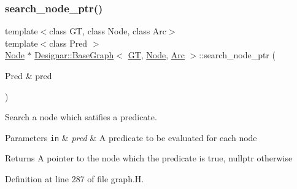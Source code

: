 \subsubsection{\texorpdfstring{search\+\_\+node\+\_\+ptr()}{search\_node\_ptr()}\hspace{0.1cm}{\footnotesize\ttfamily [1/2]}}
{\footnotesize\ttfamily template$<$class GT, class Node, class Arc$>$ \\
template$<$class Pred $>$ \\
\hyperlink{namespace_designar_a5af326c65aa2bd26b26c410f2030d09e}{Node} $\ast$ \hyperlink{class_designar_1_1_base_graph}{Designar\+::\+Base\+Graph}$<$ \hyperlink{demo-buildgraph_8_c_a3001c40d2c31ca87ed96cd7d1334a55e}{GT}, \hyperlink{namespace_designar_a5af326c65aa2bd26b26c410f2030d09e}{Node}, \hyperlink{namespace_designar_a3f55fb5513d62ff47cbc8f72b8e95d6f}{Arc} $>$\+::search\+\_\+node\+\_\+ptr (\begin{DoxyParamCaption}\item[{Pred \&}]{pred }\end{DoxyParamCaption})\hspace{0.3cm}{\ttfamily [inline]}}



Search a node which satifies a predicate. 


\begin{DoxyParams}[1]{Parameters}
\mbox{\tt in}  & {\em pred} & A predicate to be evaluated for each node \\
\hline
\end{DoxyParams}
\begin{DoxyReturn}{Returns}
A pointer to the node which the predicate is true, {\ttfamily nullptr} otherwise 
\end{DoxyReturn}


Definition at line 287 of file graph.\+H.

\mbox{\label{class_designar_1_1_base_graph_af19f6876395f82edc748b8c7ec7413f8}} 
